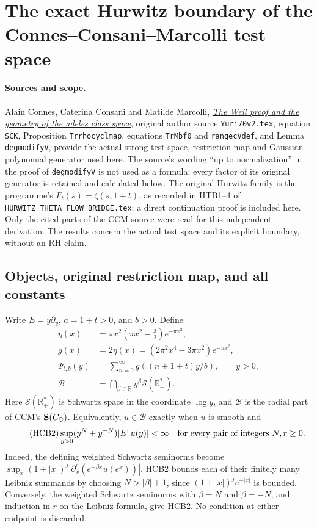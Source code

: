 \documentclass[11pt]{article}
\begin{document}
\section{The exact Hurwitz boundary of the Connes--Consani--Marcolli test space}
\label{sec:hurwitz-cc-test-space-boundary}

\paragraph{Sources and scope.}
Alain Connes, Caterina Consani and Matilde Marcolli,
\href{https://arxiv.org/abs/math/0703392}{\emph{The Weil proof and the
geometry of the adeles class space}}, original author source
\texttt{Yuri70v2.tex}, equation \texttt{SCK}, Proposition
\texttt{Trrhocyclmap}, equations \texttt{TrMbf0} and
\texttt{rangecVdef}, and Lemma \texttt{degmodifyV}, provide the actual
strong test space, restriction map and Gaussian-polynomial generator
used here. The source's wording ``up to normalization'' in the proof
of \texttt{degmodifyV} is not used as a formula: every factor of its
original generator is retained and calculated below. The original
Hurwitz family is the programme's $F_t(s)=\zeta(s,1+t)$, as recorded
in HTB1--4 of \texttt{HURWITZ\_THETA\_FLOW\_BRIDGE.tex}; a direct
continuation proof is included here. Only the cited parts of the CCM
source were read for this independent derivation. The results concern
the actual test space and its explicit boundary, without an RH claim.

\subsection{Objects, original restriction map, and all constants}

Write $E=y\partial_y$, $a=1+t>0$, and $b>0$. Define
\begin{equation}\tag{HCB1}
\begin{split}
 \eta(x)&=\pi x^2(\pi x^2-\tfrac32)e^{-\pi x^2},\\
 g(x)&=2\eta(x)=(2\pi^2x^4-3\pi x^2)e^{-\pi x^2},\\
 \Psi_{t,b}(y)&=\sum_{n=0}^{\infty}g((n+1+t)y/b),\qquad y>0,\\
 \mathcal B&=\bigcap_{\beta\in\mathbb R}y^\beta
                 \mathcal S(\mathbb R_+^*).
\end{split}
\end{equation}
Here $\mathcal S(\mathbb R_+^*)$ is Schwartz space in the coordinate
$\log y$, and $\mathcal B$ is the radial part of CCM's
${\bf S}(C_{\mathbb Q})$. Equivalently, $u\in\mathcal B$ exactly when
$u$ is smooth and
\begin{equation}\tag{HCB2}
 \sup_{y>0}(y^N+y^{-N})|E^r u(y)|<\infty
 \quad\hbox{for every pair of integers }N,r\geq0.
\end{equation}
Indeed, the defining weighted Schwartz seminorms become
$\sup_x(1+|x|)^j|\partial_x^r(e^{-\beta x}u(e^x))|$.
HCB2 bounds each of their finitely many Leibniz summands by choosing
$N>|\beta|+1$, since $(1+|x|)^j e^{-|x|}$ is bounded. Conversely,
the weighted Schwartz seminorms with $\beta=N$ and $\beta=-N$, and
induction in $r$ on the Leibniz formula, give HCB2. No condition at
either endpoint is discarded.
\end{document}
